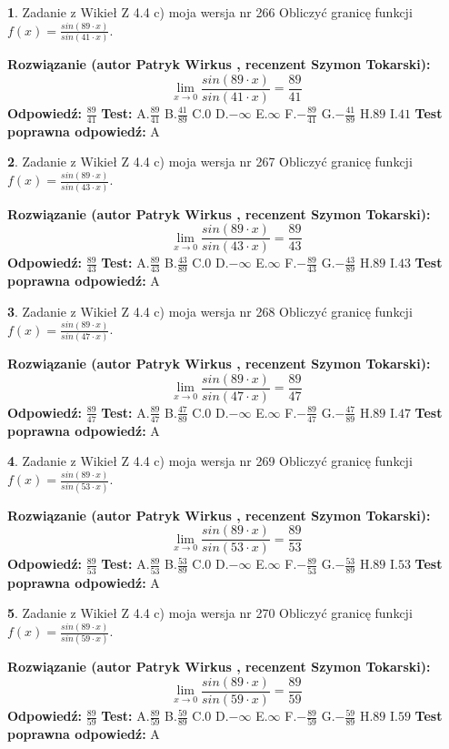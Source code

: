 \documentclass[12pt, a4paper]{article}
\theoremstyle{definition} %
\newtheorem{zad}{}
\newcommand{\zadStart}[1]{\begin{zad}#1\newline}
\newcommand{\zadStop}{\end{zad}}
\newcommand{\rozwStart}[2]{\noindent \textbf{Rozwiązanie (autor #1 , recenzent #2): }\newline}
\newcommand{\rozwStop}{\newline}
\newcommand{\odpStart}{\noindent \textbf{Odpowiedź:}\newline}
\newcommand{\odpStop}{\newline}
\newcommand{\testStart}{\noindent \textbf{Test:}\newline}
\newcommand{\testStop}{\newline}
\newcommand{\kluczStart}{\noindent \textbf{Test poprawna odpowiedź:}\newline}
\newcommand{\kluczStop}{\newline}
\begin{document}
\zadStart{Zadanie z Wikieł Z 4.4 c) moja wersja nr 266}
Obliczyć granicę funkcji $f(x)=\frac{sin(89\cdot x)}{sin(41\cdot x)}$.
\zadStop
\rozwStart{Patryk Wirkus}{Szymon Tokarski}
$$\lim\limits_{x\to 0}\frac{sin(89\cdot x)}{sin(41\cdot x)}=
\frac{89}{41}$$
\rozwStop
\odpStart
$\frac{89}{41}$
\odpStop
\testStart
A.$\frac{89}{41}$
B.$\frac{41}{89}$
C.$0$
D.$-\infty$
E.$\infty$
F.$-\frac{89}{41}$
G.$-\frac{41}{89}$
H.$89$
I.$41$
\testStop
\kluczStart
A
\kluczStop



\zadStart{Zadanie z Wikieł Z 4.4 c) moja wersja nr 267}
Obliczyć granicę funkcji $f(x)=\frac{sin(89\cdot x)}{sin(43\cdot x)}$.
\zadStop
\rozwStart{Patryk Wirkus}{Szymon Tokarski}
$$\lim\limits_{x\to 0}\frac{sin(89\cdot x)}{sin(43\cdot x)}=
\frac{89}{43}$$
\rozwStop
\odpStart
$\frac{89}{43}$
\odpStop
\testStart
A.$\frac{89}{43}$
B.$\frac{43}{89}$
C.$0$
D.$-\infty$
E.$\infty$
F.$-\frac{89}{43}$
G.$-\frac{43}{89}$
H.$89$
I.$43$
\testStop
\kluczStart
A
\kluczStop



\zadStart{Zadanie z Wikieł Z 4.4 c) moja wersja nr 268}
Obliczyć granicę funkcji $f(x)=\frac{sin(89\cdot x)}{sin(47\cdot x)}$.
\zadStop
\rozwStart{Patryk Wirkus}{Szymon Tokarski}
$$\lim\limits_{x\to 0}\frac{sin(89\cdot x)}{sin(47\cdot x)}=
\frac{89}{47}$$
\rozwStop
\odpStart
$\frac{89}{47}$
\odpStop
\testStart
A.$\frac{89}{47}$
B.$\frac{47}{89}$
C.$0$
D.$-\infty$
E.$\infty$
F.$-\frac{89}{47}$
G.$-\frac{47}{89}$
H.$89$
I.$47$
\testStop
\kluczStart
A
\kluczStop



\zadStart{Zadanie z Wikieł Z 4.4 c) moja wersja nr 269}
Obliczyć granicę funkcji $f(x)=\frac{sin(89\cdot x)}{sin(53\cdot x)}$.
\zadStop
\rozwStart{Patryk Wirkus}{Szymon Tokarski}
$$\lim\limits_{x\to 0}\frac{sin(89\cdot x)}{sin(53\cdot x)}=
\frac{89}{53}$$
\rozwStop
\odpStart
$\frac{89}{53}$
\odpStop
\testStart
A.$\frac{89}{53}$
B.$\frac{53}{89}$
C.$0$
D.$-\infty$
E.$\infty$
F.$-\frac{89}{53}$
G.$-\frac{53}{89}$
H.$89$
I.$53$
\testStop
\kluczStart
A
\kluczStop



\zadStart{Zadanie z Wikieł Z 4.4 c) moja wersja nr 270}
Obliczyć granicę funkcji $f(x)=\frac{sin(89\cdot x)}{sin(59\cdot x)}$.
\zadStop
\rozwStart{Patryk Wirkus}{Szymon Tokarski}
$$\lim\limits_{x\to 0}\frac{sin(89\cdot x)}{sin(59\cdot x)}=
\frac{89}{59}$$
\rozwStop
\odpStart
$\frac{89}{59}$
\odpStop
\testStart
A.$\frac{89}{59}$
B.$\frac{59}{89}$
C.$0$
D.$-\infty$
E.$\infty$
F.$-\frac{89}{59}$
G.$-\frac{59}{89}$
H.$89$
I.$59$
\testStop
\kluczStart
A
\kluczStop
\end{document}
